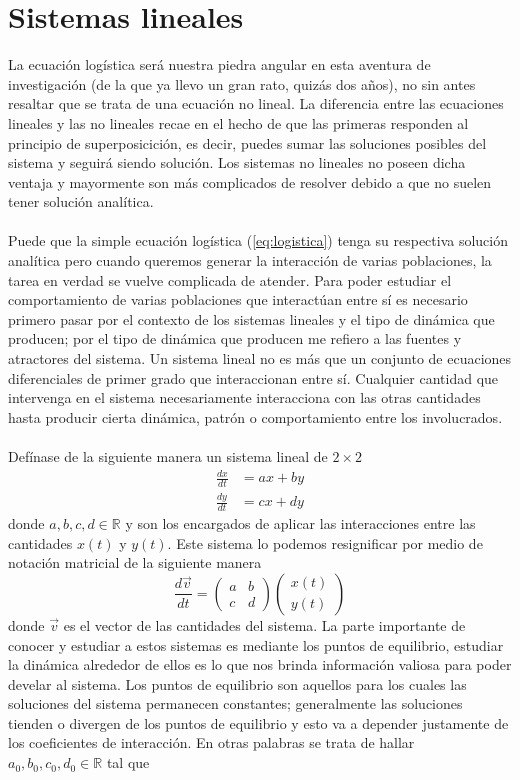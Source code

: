 \documentclass[11pt,a4paper]{article}
\begin{document}
\section{Sistemas lineales}

La ecuación logística será nuestra piedra angular en esta aventura de investigación (de la que ya llevo un gran rato, quizás dos años), no sin antes resaltar que se trata de una ecuación no lineal. La diferencia entre las ecuaciones lineales y las no lineales recae en el hecho de que las primeras responden al principio de superposicición, es decir, puedes sumar las soluciones posibles del sistema y seguirá siendo solución. Los sistemas no lineales no poseen dicha ventaja y mayormente son más complicados de resolver debido a que no suelen tener solución analítica.\\
\\
Puede que la simple ecuación logística (\ref{eq:logistica}) tenga su respectiva solución analítica pero cuando queremos generar la interacción de varias poblaciones, la tarea en verdad se vuelve complicada de atender. Para poder estudiar el comportamiento de varias poblaciones que interactúan entre sí es necesario primero pasar por el contexto de los sistemas lineales y el tipo de dinámica que producen; por el tipo de dinámica que producen me refiero a las fuentes y atractores del sistema. Un sistema lineal no es más que un conjunto de ecuaciones diferenciales de primer grado que interaccionan entre sí. Cualquier cantidad que intervenga en el sistema necesariamente interacciona con las otras cantidades hasta producir cierta dinámica, patrón o comportamiento entre los involucrados.\\
\\
Defínase de la siguiente manera un sistema lineal de $2\times2$
\begin{align*}
\frac{dx}{dt}&=ax+by\\
\frac{dy}{dt}&=cx+dy
\end{align*}
donde $a,b,c,d\in\mathbb{R}$ y son los encargados de aplicar las interacciones entre las cantidades $x(t)$ y $y(t)$. Este sistema lo podemos resignificar por medio de notación matricial de la siguiente manera
$$\frac{d\vec{v}}{dt}=\begin{pmatrix}
a & b\\
c & d
\end{pmatrix}\begin{pmatrix}
x(t)\\
y(t)
\end{pmatrix}
$$
donde $\vec{v}$ es el vector de las cantidades del sistema. La parte importante de conocer y estudiar a estos sistemas es mediante los puntos de equilibrio, estudiar la dinámica alrededor de ellos es lo que nos brinda información valiosa para poder develar al sistema. Los puntos de equilibrio son aquellos para los cuales las soluciones del sistema permanecen constantes; generalmente las soluciones tienden o divergen de los puntos de equilibrio y esto va a depender justamente de los coeficientes de interacción. En otras palabras se trata de hallar $a_0,b_0,c_0,d_0\in\mathbb{R}$ tal que 
\end{document}
